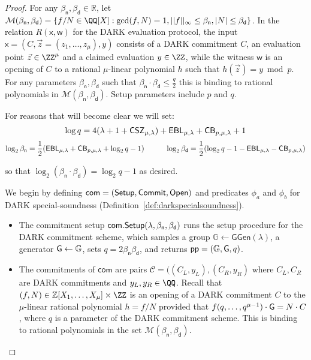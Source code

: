 \begin{proof} 

For any $\beta_\textsf{n}, \beta_\textsf{d} \in \mathbb{R}$, let $\mathcal{M}(\beta_\textsf{n}, \beta_\textsf{d}) = \{f/N \in \QQ[X]: \gcd(f, N) = 1, ||f||_\infty \leq \beta_\textsf{n}, |N| \leq \beta_\textsf{d}\}$. In the relation $R(\mathsf{x}, \mathsf{w})$ for the DARK evaluation protocol, the input $\mathsf{x} = (C, \vec{z}=(z_1,\dots,z_\mu), y)$ consists of a DARK commitment $C$, an evaluation point $\vec{z}\in \ZZ^{\mu}$ and a claimed evaluation $y \in \ZZ$, while the witness $\mathsf{w}$ is an opening of $C$ to a rational $\mu$-linear polynomial $h$ such that $h(\vec{z}) = y \bmod p$. For any parameters $\beta_\textsf{n}, \beta_\textsf{d}$ such that $\beta_\textsf{n} \cdot \beta_\textsf{d} \leq \frac{q}{2}$ this is binding to rational polynomials in $\mathcal{M}(\beta_\textsf{n}, \beta_\textsf{d})$. Setup parameters include $p$ and $q$. 

For reasons that will become clear we will set: 
$$\log q = 4(\lambda + 1 + \CSZ[\mu]) + \EBL[\mu] + \CorrectnessBound + 1$$
$$\log_2 \beta_\textsf{n} = \frac{1}{2} (\mathsf{EBL}_{\mu, \lambda} + \mathsf{CB}_{p, \mu, \lambda} + \log_2 q - 1) \hspace{10mm} \log_2 \beta_\textsf{d} = \frac{1}{2} (\log_2 q - 1 - \mathsf{EBL}_{\mu, \lambda} -  \mathsf{CB}_{p, \mu, \lambda}) $$

so that $\log_2 (\beta_\textsf{n} \cdot \beta_{\textsf{d}}) = \log_2 q - 1$ as desired. 
\medskip 

We begin by defining $\textsf{com} = (\setup, \textsf{Commit}, \open)$ and predicates $\phi_a$ and $\phi_b$ for DARK special-soundness (Definition~\ref{def:darkspecialsoundness}). %
 
\begin{itemize} 
\item The commitment setup $\textsf{com}.\setup(\lambda, \beta_\textsf{n}, \beta_\textsf{d})$ runs the setup procedure for the DARK commitment scheme, which samples a group $\mathbb{G} \gets \textsf{GGen}(\lambda)$, a generator $\gr{G} \gets \mathbb{G}$, sets $q = 2 \beta_\textsf{n} \beta_\textsf{d}$, and returns $\crs = (\mathbb{G}, \gr{G}, q)$. 
\item The commitments of $\textsf{com}$ are pairs $\mathcal{C} = ((C_L, y_L), (C_R, y_R)$ where $C_L, C_R$ are DARK commitments and $y_L, y_R \in \QQ$. Recall that $(f, N) \in \mathbb{Z}[X_1,\dots,X_\mu] \times \ZZ$ is an opening of a DARK commitment $C$ to the $\mu$-linear rational polynomial $h = f/N$ provided that  $f(q,\dots,q^{\mu-1}) \cdot \gr{G} = N \cdot C$, where $q$ is a parameter of the DARK commitment scheme. This is binding to rational polynomials in the set $\mathcal{M}(\beta_\textsf{n}, \beta_\textsf{d})$.


\end{itemize}
\end{proof}

